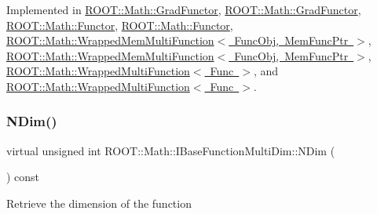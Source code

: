 Implemented in \mbox{\hyperlink{classROOT_1_1Math_1_1GradFunctor_a21093c0d3001069e49ce6278b5a32a40}{R\+O\+O\+T\+::\+Math\+::\+Grad\+Functor}}, \mbox{\hyperlink{classROOT_1_1Math_1_1GradFunctor_a21093c0d3001069e49ce6278b5a32a40}{R\+O\+O\+T\+::\+Math\+::\+Grad\+Functor}}, \mbox{\hyperlink{classROOT_1_1Math_1_1Functor_a989f9b6dd160ebe03911cdee00dacaad}{R\+O\+O\+T\+::\+Math\+::\+Functor}}, \mbox{\hyperlink{classROOT_1_1Math_1_1Functor_a989f9b6dd160ebe03911cdee00dacaad}{R\+O\+O\+T\+::\+Math\+::\+Functor}}, \mbox{\hyperlink{classROOT_1_1Math_1_1WrappedMemMultiFunction_ab9f49fc9a151e8d921dbe9cb148c1fc8}{R\+O\+O\+T\+::\+Math\+::\+Wrapped\+Mem\+Multi\+Function$<$ Func\+Obj, Mem\+Func\+Ptr $>$}}, \mbox{\hyperlink{classROOT_1_1Math_1_1WrappedMemMultiFunction_ab9f49fc9a151e8d921dbe9cb148c1fc8}{R\+O\+O\+T\+::\+Math\+::\+Wrapped\+Mem\+Multi\+Function$<$ Func\+Obj, Mem\+Func\+Ptr $>$}}, \mbox{\hyperlink{classROOT_1_1Math_1_1WrappedMultiFunction_aafa24e359a607b4278f1bf238bdbc336}{R\+O\+O\+T\+::\+Math\+::\+Wrapped\+Multi\+Function$<$ Func $>$}}, and \mbox{\hyperlink{classROOT_1_1Math_1_1WrappedMultiFunction_aafa24e359a607b4278f1bf238bdbc336}{R\+O\+O\+T\+::\+Math\+::\+Wrapped\+Multi\+Function$<$ Func $>$}}.

\mbox{\label{classROOT_1_1Math_1_1IBaseFunctionMultiDim_a16f37dc7a6d00c75ddeda0697741315d}} 
\subsubsection{\texorpdfstring{NDim()}{NDim()}\hspace{0.1cm}{\footnotesize\ttfamily [1/2]}}
{\footnotesize\ttfamily virtual unsigned int R\+O\+O\+T\+::\+Math\+::\+I\+Base\+Function\+Multi\+Dim\+::\+N\+Dim (\begin{DoxyParamCaption}{ }\end{DoxyParamCaption}) const\hspace{0.3cm}{\ttfamily [pure virtual]}}

Retrieve the dimension of the function 

